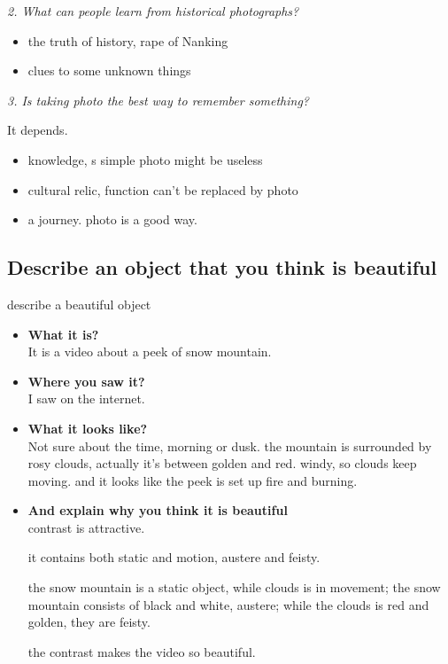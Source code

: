\documentclass[conference]{IEEEtran}
\begin{document}
\textit{2. What can people learn from historical photographs?}

\begin{itemize}
    \item the truth of history, rape of Nanking
    \item clues to some unknown things
\end{itemize}

\textit{3. Is taking photo the best way to remember something?}

It depends.

\begin{itemize}
    \item knowledge, s simple photo might be useless
    \item cultural relic, function can't be replaced by photo
    \item a journey. photo is a good way.
\end{itemize}

\subsection{Describe an object that you think is beautiful}
describe a beautiful object
\begin{itemize}
    \item \textbf{What it is?}\\
    It is a video about a peek of snow mountain.

    \item \textbf{Where you saw it?}\\
    I saw on the internet.

    \item \textbf{What it looks like?}\\
    Not sure about the time, morning or dusk.
    the  mountain is surrounded by rosy clouds, actually it's between golden and red.
    windy, so clouds keep moving.
    and it looks like the peek is set up fire and burning.

    \item \textbf{And explain why you think it is beautiful}\\
    contrast is attractive.

    it contains both static and motion, austere and feisty.

    the snow mountain is a static object, while clouds is in movement;
    the snow mountain consists of black and white, austere;
    while the clouds is red and golden, they are feisty.

    the contrast makes the video so beautiful.
\end{itemize}
\end{document}
